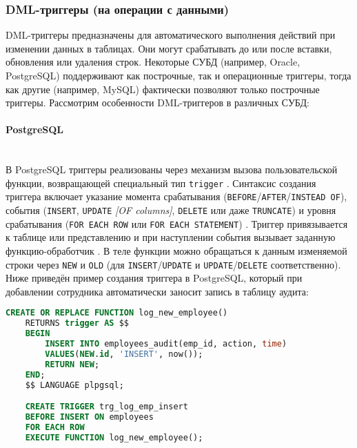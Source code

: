 \subsubsection{DML-триггеры (на операции с данными)}

 DML-триггеры предназначены для автоматического выполнения действий при изменении данных в таблицах. Они могут срабатывать до или после вставки, обновления или удаления строк. Некоторые СУБД (например, Oracle, PostgreSQL) поддерживают как построчные, так и операционные триггеры, тогда как другие (например, MySQL) фактически позволяют только построчные триггеры. Рассмотрим особенности DML-триггеров в различных СУБД:

 \paragraph{\textbf{PostgreSQL}} ~\\

 В PostgreSQL триггеры реализованы через механизм вызова пользовательской функции, возвращающей специальный тип \texttt{trigger} \autocite{Postgresqlcom}. Синтаксис создания триггера включает указание момента срабатывания (\texttt{BEFORE}/\texttt{AFTER}/\texttt{INSTEAD OF}), события (\texttt{INSERT}, \texttt{UPDATE} \textit{[OF columns]}, \texttt{DELETE} или даже \texttt{TRUNCATE}) и уровня срабатывания (\texttt{FOR EACH ROW} или \texttt{FOR EACH STATEMENT})  \autocite{Postgresqlcom}. Триггер привязывается к таблице или представлению и при наступлении события вызывает заданную функцию-обработчик \autocite{Postgresqlcom}. В теле функции можно обращаться к данным изменяемой строки через \texttt{NEW} и \texttt{OLD} (для \texttt{INSERT}/\texttt{UPDATE} и \texttt{UPDATE}/\texttt{DELETE} соответственно). Ниже приведён пример создания триггера в PostgreSQL, который при добавлении сотрудника автоматически заносит запись в таблицу аудита:
 \begin{lstlisting}[language=SQL]
    CREATE OR REPLACE FUNCTION log_new_employee()
    RETURNS trigger AS $$
    BEGIN
        INSERT INTO employees_audit(emp_id, action, time)
        VALUES(NEW.id, 'INSERT', now());
        RETURN NEW;
    END;
    $$ LANGUAGE plpgsql;

    CREATE TRIGGER trg_log_emp_insert
    BEFORE INSERT ON employees
    FOR EACH ROW
    EXECUTE FUNCTION log_new_employee();
 \end{lstlisting}


